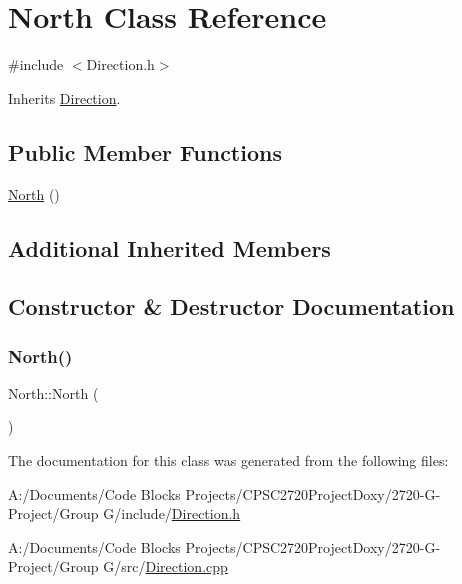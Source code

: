 \hypertarget{class_north}{}\section{North Class Reference}
\label{class_north}


{\ttfamily \#include $<$Direction.\+h$>$}



Inherits \mbox{\hyperlink{class_direction}{Direction}}.

\subsection*{Public Member Functions}
\begin{DoxyCompactItemize}
\item 
\mbox{\hyperlink{class_north_ad32d25245d0bfbfd138e868e8ba50687}{North}} ()
\end{DoxyCompactItemize}
\subsection*{Additional Inherited Members}


\subsection{Constructor \& Destructor Documentation}
\mbox{\label{class_north_ad32d25245d0bfbfd138e868e8ba50687}} 
\subsubsection{\texorpdfstring{North()}{North()}}
{\footnotesize\ttfamily North\+::\+North (\begin{DoxyParamCaption}{ }\end{DoxyParamCaption})}



The documentation for this class was generated from the following files\+:\begin{DoxyCompactItemize}
\item 
A\+:/\+Documents/\+Code Blocks Projects/\+C\+P\+S\+C2720\+Project\+Doxy/2720-\/\+G-\/\+Project/\+Group G/include/\mbox{\hyperlink{_direction_8h}{Direction.\+h}}\item 
A\+:/\+Documents/\+Code Blocks Projects/\+C\+P\+S\+C2720\+Project\+Doxy/2720-\/\+G-\/\+Project/\+Group G/src/\mbox{\hyperlink{_direction_8cpp}{Direction.\+cpp}}\end{DoxyCompactItemize}
